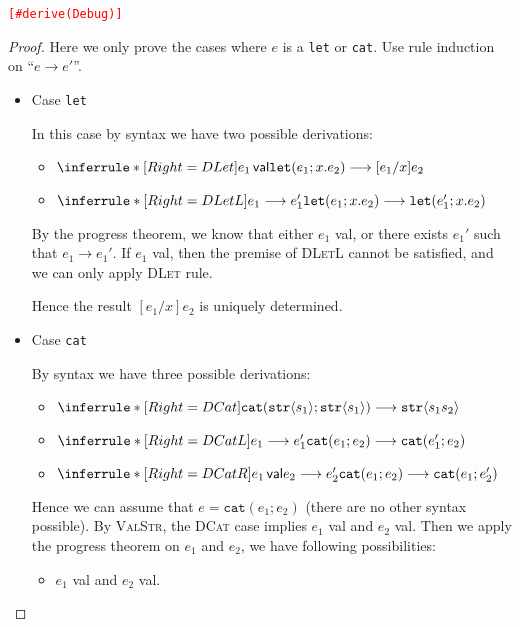 \documentclass{article}
\theoremstyle{definition}
\newcommand{\ip}[1]{\langle #1 \rangle}
\begin{document}
\noindent\textcolor{red}{\texttt{[\#derive(Debug)]}}
\begin{proof}
    Here we only prove the cases where $e$ is a \texttt{let} or \texttt{cat}.
    Use rule induction on ``$e\longrightarrow e'$''.

    \color{red}
    \begin{itemize}
        \item Case \texttt{let}

              In this case by syntax we have two possible derivations:
              \begin{itemize}
                  \item $\inferrule*[Right=DLet]{e_1 \, \mathsf{val}}{\mathtt{let}(e_1;x.e_2) \longrightarrow [e_1/x]e_2}$
                  \item $\inferrule*[Right=DLetL]{e_1\longrightarrow e_1'}{\mathtt{let}(e_1;x.e_2) \longrightarrow \mathtt{let}(e_1';x.e_2)}$
              \end{itemize}
              By the progress theorem, we know that either $e_1$ \textsf{val}, or there exists $e_1'$ such that $e_1\longrightarrow e_1'$.
              If $e_1$ \textsf{val}, then the premise of \textsc{DLetL} cannot be satisfied, and we can only apply \textsc{DLet} rule.

              Hence the result $[e_1/x]e_2$ is uniquely determined.
        \item Case \texttt{cat}

              By syntax we have three possible derivations:
              \begin{itemize}
                  \item $\inferrule*[Right=DCat]{ }{\mathtt{cat}(\mathtt{str}\ip{s_1};\mathtt{str}\ip{s_1})\longrightarrow \mathtt{str}\ip{s_1s_2}}$

                  \item $\inferrule*[Right=DCatL]{e_1\longrightarrow e_1'}{\mathtt{cat}(e_1;e_2)\longrightarrow \mathtt{cat}(e_1';e_2)}$
                  \item $\inferrule*[Right=DCatR]{e_1\,\mathsf{val} \\ e_2\longrightarrow e_2'}{\mathtt{cat}(e_1;e_2)\longrightarrow \mathtt{cat}(e_1;e_2')}$
              \end{itemize}
              Hence we can assume that $e = \mathtt{cat}(e_1;e_2)$ (there are no other syntax possible).
              By \textsc{ValStr}, the \textsc{DCat} case implies $e_1$ \textsf{val} and $e_2$ \textsf{val}.
              Then we apply the progress theorem on $e_1$ and $e_2$, we have following possibilities:
              \begin{itemize}
                  \item $e_1$ \textsf{val} and $e_2$ \textsf{val}.


\end{itemize}
\end{itemize}
\end{proof}
\end{document}
